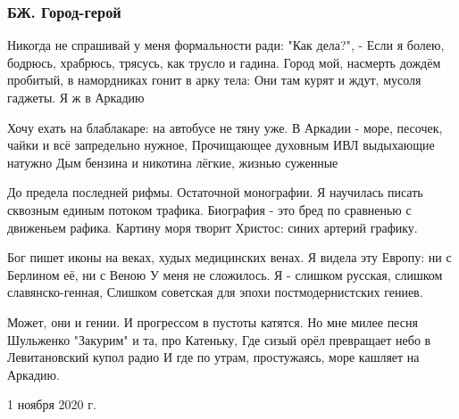  
 
 

\subsubsection{БЖ. Город-герой}
\label{sec:poetry.rus.evgenija_bilchenko.gorod_geroi}

Никогда не спрашивай у меня формальности ради: "Как дела?", -
Если я болею, бодрюсь, храбрюсь, трясусь, как трусло и гадина.
Город мой, насмерть дождём пробитый, в намордниках гонит в арку тела:
Они там курят и ждут, мусоля гаджеты. Я ж в Аркадию

Хочу ехать на блаблакаре: на автобусе не тяну уже.
В Аркадии - море, песочек, чайки и всё запредельно нужное,
Прочищающее духовным ИВЛ выдыхающие натужно
Дым бензина и никотина лёгкие, жизнью суженные

До предела последней рифмы. Остаточной монографии.
Я научилась писать сквозным единым потоком трафика.
Биография - это бред по сравненью с движеньем рафика.
Картину моря творит Христос: синих артерий графику.

Бог пишет иконы на веках, худых медицинских венах.
Я видела эту Европу: ни с Берлином её, ни с Веною
У меня не сложилось. Я - слишком русская, слишком славянско-генная,
Слишком советская для эпохи постмодернистских гениев.

Может, они и гении. И прогрессом в пустоты катятся.
Но мне милее песня Шульженко "Закурим" и та, про Катеньку,
Где сизый орёл превращает небо в Левитановский купол радио
И где по утрам, простужаясь, море кашляет на Аркадию.

1 ноября 2020 г.

